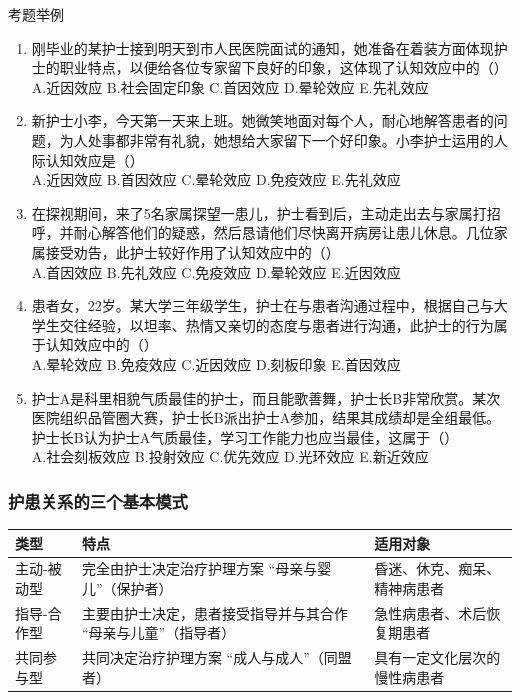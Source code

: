 \documentclass[11pt, a4paper]{ctexart}
\begin{document}
\begin{examplebox}{考题举例}
	\begin{enumerate}
		\item 刚毕业的某护士接到明天到市人民医院面试的通知，她准备在着装方面体现护士的职业特点，以便给各位专家留下良好的印象，这体现了认知效应中的（\qquad）\\
		      A.近因效应 \quad B.社会固定印象 \quad C.首因效应 \quad D.晕轮效应 \quad E.先礼效应
		\item 新护士小李，今天第一天来上班。她微笑地面对每个人，耐心地解答患者的问题，为人处事都非常有礼貌，她想给大家留下一个好印象。小李护士运用的人际认知效应是（\qquad）\\
		      A.近因效应 \quad B.首因效应 \quad C.晕轮效应 \quad D.免疫效应 \quad E.先礼效应
		\item 在探视期间，来了5名家属探望一患儿，护士看到后，主动走出去与家属打招呼，并耐心解答他们的疑惑，然后恳请他们尽快离开病房让患儿休息。几位家属接受劝告，此护士较好作用了认知效应中的（\qquad）\\
		      A.首因效应 \quad B.先礼效应 \quad C.免疫效应 \quad D.晕轮效应 \quad E.近因效应
		\item 患者女，22岁。某大学三年级学生，护士在与患者沟通过程中，根据自己与大学生交往经验，以坦率、热情又亲切的态度与患者进行沟通，此护士的行为属于认知效应中的（\qquad）\\
		      A.晕轮效应 \quad B.免疫效应 \quad C.近因效应 \quad D.刻板印象 \quad E.首因效应
		\item 护士A是科里相貌气质最佳的护士，而且能歌善舞，护士长B非常欣赏。某次医院组织品管圈大赛，护士长B派出护士A参加，结果其成绩却是全组最低。护士长B认为护士A气质最佳，学习工作能力也应当最佳，这属于（\qquad）\\
		      A.社会刻板效应 \quad B.投射效应 \quad C.优先效应 \quad D.光环效应 \quad E.新近效应
	\end{enumerate}
\end{examplebox}

\subsubsection{护患关系的三个基本模式}
\begin{table}[htbp]
	\centering
	\renewcommand{\arraystretch}{1.4} %
	\begin{tabularx}{\textwidth}{lXX}
		\toprule
		\textbf{类型} & \textbf{特点}                      & \textbf{适用对象}  \\
		\midrule
		主动-被动型      & 完全由护士决定治疗护理方案 “母亲与婴儿”（保护者）       & 昏迷、休克、痴呆、精神病患者 \\
		\addlinespace %
		指导-合作型      & 主要由护士决定，患者接受指导并与其合作 “母亲与儿童”（指导者） & 急性病患者、术后恢复期患者  \\
		\addlinespace
		共同参与型       & 共同决定治疗护理方案 “成人与成人”（同盟者）          & 具有一定文化层次的慢性病患者 \\
		\bottomrule
	\end{tabularx}
\end{table}
\end{document}
